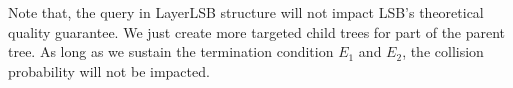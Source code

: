 Note that, the query in LayerLSB structure will not impact LSB's theoretical quality guarantee. We just create more targeted child trees for part of the parent tree. As long as we sustain the termination condition $E_1$ and $E_2$, the collision probability will not be impacted.


